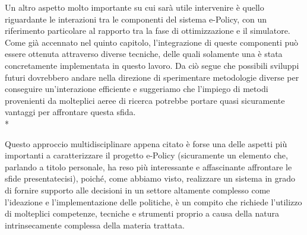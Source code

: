 Un altro aspetto molto importante su cui sarà utile intervenire è quello riguardante le interazioni tra le componenti del sistema e-Policy, con un riferimento particolare al rapporto tra la fase di ottimizzazione e il simulatore. Come già accennato nel quinto capitolo, l'integrazione di queste componenti può essere ottenuta attraverso diverse tecniche, delle quali solamente una è stata concretamente implementata in questo lavoro. Da ciò segue che possibili sviluppi futuri dovrebbero andare nella direzione di sperimentare metodologie diverse per conseguire un'interazione efficiente e suggeriamo che l'impiego di metodi provenienti da molteplici aeree di ricerca potrebbe portare quasi sicuramente vantaggi per affrontare questa sfida.
\\*

Questo approccio multidisciplinare appena citato è forse una delle aspetti più importanti a caratterizzare il progetto e-Policy (sicuramente un elemento che, parlando a titolo personale, ha reso più interessante e affascinante affrontare le sfide presentatecisi), poiché, come abbiamo visto, realizzare un sistema in grado di fornire supporto alle decisioni in un settore altamente complesso come l'ideazione e l'implementazione delle politiche, è un compito che richiede l'utilizzo di molteplici competenze, tecniche e strumenti proprio a causa della natura intrinsecamente complessa della materia trattata. 

%
